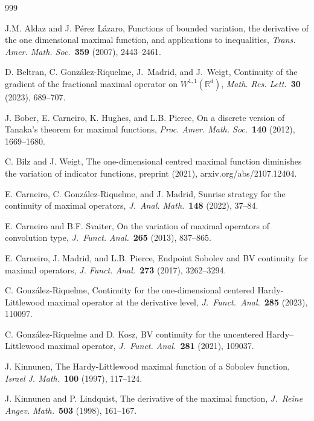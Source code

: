 \documentclass[leqno,11pt]{amsart}
\numberwithin{equation}{section}
\numberwithin{theorem}{section}
\newcommand{\RR}{\mathbb{R}}
\begin{document}
\begin{thebibliography}{999}
	
	 J.M. Aldaz and J. P{\'e}rez L{\'a}zaro,  
	Functions of bounded variation, the derivative of the one dimensional maximal function, and applications to inequalities,
	\emph{Trans. Amer. Math. Soc.}~{\bf 359} (2007), 2443--2461.
	
	 D. Beltran, C. Gonz{\'a}lez-Riquelme, J.~Madrid, and J.~Weigt,  
	Continuity of the gradient of the fractional maximal operator on $W^{1,1}(\RR^d)$,
	\emph{Math. Res. Lett.}~{\bf 30} (2023), 689--707.

	 J. Bober, E. Carneiro, K. Hughes, and L.B. Pierce, On a discrete version of Tanaka’s theorem for
	maximal functions, \emph{Proc. Amer. Math. Soc.}~{\bf 140} (2012), 1669--1680.
	
	 C. Bilz and J. Weigt,  
	The one-dimensional centred maximal function diminishes the variation of indicator functions,
	preprint (2021), arxiv.org/abs/2107.12404.
	
	 E. Carneiro, C. Gonz{\'a}lez-Riquelme, and J. Madrid,  
	Sunrise strategy for the continuity of maximal operators,
	\emph{J.~Anal. Math.}~{\bf 148} (2022), 37--84.
	
	 E. Carneiro and B.F. Svaiter,
	On the variation of maximal operators of convolution type,
	\emph{J.~Funct. Anal.}~{\bf 265} (2013), 837--865.
	
	 E. Carneiro, J. Madrid, and L.B. Pierce,  
	Endpoint Sobolev and BV continuity for maximal operators,
	\emph{J. Funct. Anal.}~{\bf 273} (2017), 3262--3294.
	
	 C. Gonz{\'a}lez-Riquelme,  
	Continuity for the one-dimensional centered Hardy-Littlewood maximal operator at the derivative level,
	\emph{J.~Funct.~Anal.}~{\bf 285} (2023), 110097.
	
	 C. Gonz{\'a}lez-Riquelme and D. Kosz,  
	BV continuity for the uncentered Hardy--Littlewood maximal operator,
	\emph{J.~Funct. Anal.}~{\bf 281} (2021), 109037.
	
	 J. Kinnunen,  
	The Hardy-Littlewood maximal function of a Sobolev function,
	\emph{Israel J. Math.}~{\bf 100} (1997), 117--124.
	
	 J. Kinnunen and P. Lindquist,
	The derivative of the  maximal function,
	\emph{J.~Reine Angev. Math.}~{\bf 503} (1998), 161--167.
	

\end{thebibliography}
\end{document}
